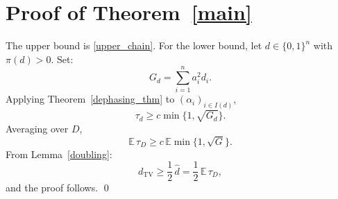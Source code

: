 \documentclass[12pt,reqno]{amsart}
\numberwithin{equation}{section}
\begin{document}
\section{Proof of Theorem~\ref{main}}\label{proof_main}

The upper bound is \eqref{upper_chain}. For the lower bound, let
\(d\in\{0,1\}^n\) with \(\pi(d)>0\). Set:
\[
G_d=\sum_{i=1}^na_i^2d_i.
\]
Applying Theorem~\ref{dephasing_thm} to
\((\alpha_i)_{i\in I(d)}\),
\[
\tau_d\ge c\min\{1,\sqrt{G_d}\}.
\]
Averaging over \(D\), 
\[
\mathbb E\,\tau_D \ge c\, \mathbb E \min\{1, \sqrt{G}\}.
\]
From Lemma~\ref{doubling}:
\[
d_{\mathrm{TV}}
\ge
\frac12\,\widehat d
=
\frac12\,\mathbb E\,\tau_D,
\]
and the proof follows. \qed



\end{document}
